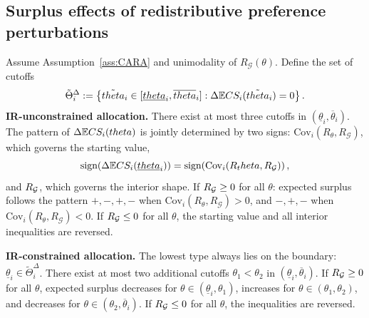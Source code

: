 \documentclass[master.tex]{subfiles}
\begin{document}
\subsection{Surplus effects of redistributive preference perturbations}

\begin{proposition}\label{prop:surplus-redist}
Assume Assumption~\ref{ass:CARA} and unimodality of $R_{\mathcal{G}}(\theta)$. Define the set of cutoffs
\[
\tilde\Theta_i^\Delta := \left\{\tilde{theta}_i\in[\underline{theta}_i,\overline{theta}_i] : \Delta\mathbb{E} CS_i(\tilde{theta}_i)=0\right\}.
\]
\noindent\textbf{IR-unconstrained allocation.} There exist at most three cutoffs in $(\underline\theta_i,\overline\theta_i)$. The pattern of $\Delta\mathbb{E} CS_i(theta)$ is jointly determined by two signs: $\mathrm{Cov}_{i}(R_\theta,R_{\mathcal{G}})$, which governs the starting value,
\[\textnormal{sign}\!\left(\Delta\mathbb{E} CS_i(\underline{theta}_i)\right)=\textnormal{sign}\!\left(\mathrm{Cov}_{i}(R_theta,R_{\mathcal{G}})\right),\]
and $R_{\mathcal{G}}$, which governs the interior shape. If $R_{\mathcal{G}}\ge 0$ for all $\theta$: expected surplus follows the pattern $+,-,+,-$ when $\mathrm{Cov}_{i}(R_\theta,R_{\mathcal{G}})>0$, and $-,+,-$ when $\mathrm{Cov}_{i}(R_\theta,R_{\mathcal{G}})<0$. If $R_{\mathcal{G}}\le 0$ for all $\theta$, the starting value and all interior inequalities are reversed.

\noindent\textbf{IR-constrained allocation.} The lowest type always lies on the boundary: $\underline\theta_i\in\tilde\Theta_i^\Delta$. There exist at most two additional cutoffs $\theta_1<\theta_2$ in $(\underline\theta_i,\overline\theta_i)$. If $R_{\mathcal{G}}\ge 0$ for all $\theta$, expected surplus decreases for $\theta\in(\underline\theta_i,\theta_1)$, increases for $\theta\in(\theta_1,\theta_2)$, and decreases for $\theta\in(\theta_2,\overline\theta_i)$. If $R_{\mathcal{G}}\le 0$ for all $\theta$, the inequalities are reversed.
\end{proposition}
\end{document}
